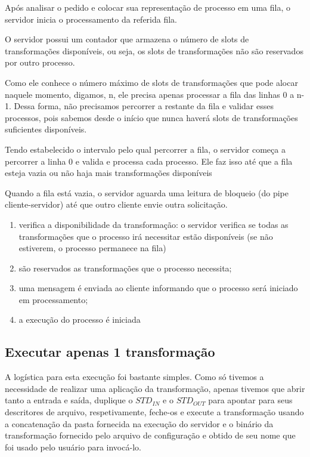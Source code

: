 \documentclass[a4paper]{report}
\begin{document}
	Após analisar o pedido e colocar sua representação de processo em uma fila, o servidor inicia o processamento da referida fila.
    
    O servidor possui um contador que armazena o número de slots de transformações disponíveis, ou seja, os slots de transformações não são reservados por outro processo.

    Como ele conhece o número máximo de slots de transformações que pode alocar naquele momento, digamos, n, ele precisa apenas processar a fila das linhas 0 a n-1. Dessa forma, não precisamos percorrer a restante da fila e validar esses processos, pois sabemos desde o início que nunca haverá slots de transformações suficientes disponíveis.

    Tendo estabelecido o intervalo pelo qual percorrer a fila, o servidor começa a percorrer a linha 0 e valida e processa cada processo. Ele faz isso até que a fila esteja vazia ou não haja mais transformações disponíveis
    
    Quando a fila está vazia, o servidor aguarda uma leitura de bloqueio (do pipe cliente-servidor) até que outro cliente envie outra solicitação.

    \begin{enumerate}
        \item verifica a disponibilidade da transformação: o servidor verifica se todas as transformações que o processo irá necessitar estão disponíveis (se não estiverem, o processo permanece na fila)
        \item são reservados as transformações que o processo necessita;
        \item uma mensagem é enviada ao cliente informando que o processo será iniciado em processamento;
        \item a execução do processo é iniciada
    \end{enumerate}
    
    \subsection{Executar apenas 1 transformação}
    A logística para esta execução foi bastante simples. Como só tivemos a necessidade de realizar uma aplicação da transformação, apenas tivemos que abrir tanto a entrada e saída, duplique o $STD_{IN}$ e o $STD_{OUT}$ para apontar para seus descritores de arquivo, respetivamente, feche-os e execute a transformação usando a concatenação da pasta fornecida na execução do servidor e o binário da transformação fornecido pelo arquivo de configuração e obtido de seu nome que foi usado pelo usuário para invocá-lo.
    
\end{document}
